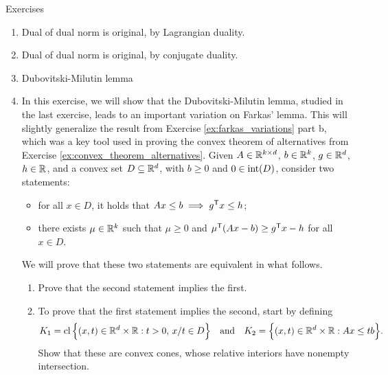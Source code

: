\begin{xcb}{Exercises}
\begin{enumerate}[label=\thechapter.\arabic*]
\begin{proof}
Facts (i) and (ii) follow directly by definition of $d$ and $\|\cdot\|_*$. Next
define . One can verify that $\partial
g(x) = d(x)$. Moreover, the conjugate of $g$ is  
\[
g^*(y) = \sup_x \, y^\T x - \frac{1}{2} \|x\|_*^2.
\]
By taking a subgradient and setting this equal to zero, we see that the supremum
is achieved for $y \in d(x)$. Plugging this in, and using facts (ii) and (i) gives 
\[
g^*(y) = \frac{1}{2} \|y\|^2.
\]
Therefore facts (iii) and (iv) follow from the conjugate relation $y \in
\partial g(x) \iff x \in \partial g^*(x)$.   
\end{proof} 

\item \label{ex:dual_norm_dual2}
Dual of dual norm is original, by Lagrangian duality.

\item \label{ex:dual_norm_dual3}
Dual of dual norm is original, by conjugate duality.

\item \label{ex:dubovitski_milutin}
Dubovitski-Milutin lemma

\item \label{ex:farkas_variations_conic} 
  In this exercise, we will show that the Dubovitski-Milutin lemma, studied in
  the last exercise, leads to an important variation on Farkas' lemma. This will 
  slightly generalize the result from Exercise \ref{ex:farkas_variations} part
  b, which was a key tool used in proving the convex theorem of alternatives
  from Exercise \ref{ex:convex_theorem_alternatives}. Given $A \in \mathbb{R}^{k \times
    d}$, $b \in \mathbb{R}^k$, $g \in \mathbb{R}^d$, $h \in \mathbb{R}$, and a convex set $D \subseteq
  \mathbb{R}^d$, with $b \geq 0$ and $0 \in \operatorname{int}(D)$, consider two statements:       
  \begin{itemize}
  \item for all $x \in D$, it holds that $Ax \leq b \implies g^{\mathsf{T}} x \leq h$;  
  \item there exists $\mu \in \mathbb{R}^k$ such that $\mu \geq 0$ and $\mu^{\mathsf{T}} (Ax - b) 
    \geq g^{\mathsf{T}} x - h$ for all $x \in D$.
  \end{itemize}
  We will prove that these two statements are equivalent in what follows.

\begin{enumerate}[label=\alph*.]
\item Prove that the second statement implies the first.

\item To prove that the first statement implies the second, start by defining 
  \[
  K_1 = \operatorname{cl} \Big\{ (x,t) \in \mathbb{R}^d \times \mathbb{R}: t > 0, \, x/t \in D \Big\}
  \quad \text{and} \quad K_2 = \Big\{ (x,t) \in \mathbb{R}^d \times \mathbb{R}: Ax \leq tb
  \Big\}.  
  \]
  Show that these are convex cones, whose relative interiors have nonempty  
  intersection.


\end{enumerate}
\end{enumerate}
\end{xcb}
